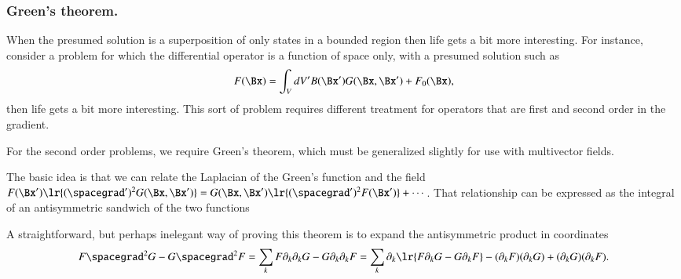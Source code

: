 \subsubsection{Green's theorem.}

When the presumed solution is a superposition of only states in a bounded region
then life gets a bit more interesting.  For instance, consider a problem for which the differential operator is a function of space only, with a presumed solution such as
\begin{dmath}\label{eqn:greensFunctionSolutions:200}
F(\Bx) = \int_V dV' B(\Bx') G(\Bx, \Bx') + F_0(\Bx),
\end{dmath}
then life gets a bit more interesting.
This sort of problem requires different treatment for operators that are first and second order in the gradient.

For the second order problems, we require Green's theorem, which must be generalized slightly for use with multivector fields.

The basic idea is that we can relate the Laplacian of the Green's function and the field
\( F(\Bx') \lr{ (\spacegrad')^2 G(\Bx, \Bx') } = G(\Bx, \Bx') \lr{ (\spacegrad')^2 F(\Bx')} + \cdots \).
That relationship can be expressed as the integral of an antisymmetric sandwich of the two functions


A straightforward, but perhaps inelegant way of proving this theorem is to expand the antisymmetric product in coordinates
\begin{dmath}\label{eqn:greensFunctionSolutions:260}
F \spacegrad^2 G - G \spacegrad^2 F
=
\sum_k F \partial_k \partial_k G - G \partial_k \partial_k F
=
\sum_k \partial_k \lr{
F \partial_k G - G \partial_k F
}
-
(\partial_k F)(\partial_k G) + (\partial_k G)(\partial_k F).
\end{dmath}

